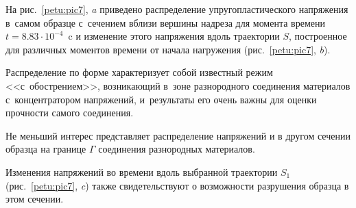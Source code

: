 %


%


%




%


%





%





На рис.~\ref{petu:pic7}, {\sl a} приведено распределение упругопластического напряжения в~самом образце с~сечением вблизи вершины надреза  для момента времени $t = 8.83\cdot 10^{-4}$~c и изменение этого напряжения вдоль траектории $S$, построенное для различных моментов времени от начала нагружения (рис.~\ref{petu:pic7}, {\sl b}). 

Распределение по форме характеризует собой известный режим <<с~обострением>>, возникающий в~зоне разнородного соединения материалов с~концентратором напряжений, и~результаты его очень важны для оценки прочности самого соединения.



Не меньший интерес представляет распределение напряжений и в другом сечении образца на границе $\Gamma$ соединения разнородных материалов. 

Изменения напряжений во времени вдоль выбранной траектории $S_1$ (рис.~\ref{petu:pic7}, {\sl c}) также свидетельствуют о возможности разрушения образца в этом сечении.



